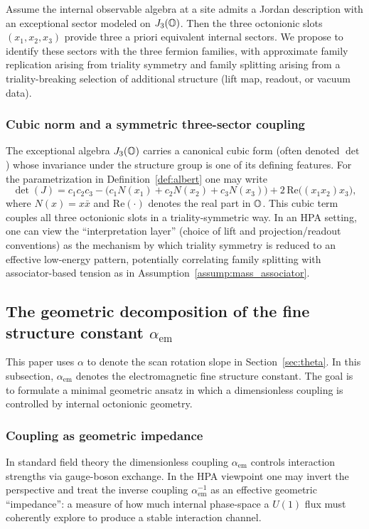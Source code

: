 \begin{assumption}
\label{assump:generations_j3o}
Assume the internal observable algebra at a site admits a Jordan description with an exceptional sector modeled on $J_3(\mathbb{O})$.
Then the three octonionic slots $(x_1,x_2,x_3)$ provide three a priori equivalent internal sectors.
We propose to identify these sectors with the three fermion families, with approximate family replication arising from triality symmetry and family splitting arising from a triality-breaking selection of additional structure (lift map, readout, or vacuum data).
\end{assumption}

\subsubsection{Cubic norm and a symmetric three-sector coupling}
The exceptional algebra $J_3(\mathbb{O})$ carries a canonical cubic form (often denoted $\det$) whose invariance under the structure group is one of its defining features.
For the parametrization in Definition~\ref{def:albert} one may write \cite{Albert1934,ConwaySmith2003}
$$
\det(J)=c_1c_2c_3-\big(c_1 N(x_1)+c_2 N(x_2)+c_3 N(x_3)\big)+2\,\mathrm{Re}\big((x_1x_2)x_3\big),
$$
where $N(x)=x\bar{x}$ and $\mathrm{Re}(\cdot)$ denotes the real part in $\mathbb{O}$.
This cubic term couples all three octonionic slots in a triality-symmetric way.
In an HPA setting, one can view the ``interpretation layer'' (choice of lift and projection/readout conventions) as the mechanism by which triality symmetry is reduced to an effective low-energy pattern, potentially correlating family splitting with associator-based tension as in Assumption~\ref{assump:mass_associator}.

\subsection{The geometric decomposition of the fine structure constant \texorpdfstring{$\alpha_{\mathrm{em}}$}{alpha}}
\label{subsec:alpha_geo_decomposition}
This paper uses $\alpha$ to denote the scan rotation slope in Section~\ref{sec:theta}.
In this subsection, $\alpha_{\mathrm{em}}$ denotes the electromagnetic fine structure constant.
The goal is to formulate a minimal geometric ansatz in which a dimensionless coupling is controlled by internal octonionic geometry.

\subsubsection{Coupling as geometric impedance}
In standard field theory the dimensionless coupling $\alpha_{\mathrm{em}}$ controls interaction strengths via gauge-boson exchange.
In the HPA viewpoint one may invert the perspective and treat the inverse coupling $\alpha_{\mathrm{em}}^{-1}$ as an effective geometric ``impedance'': a measure of how much internal phase-space a $U(1)$ flux must coherently explore to produce a stable interaction channel.

